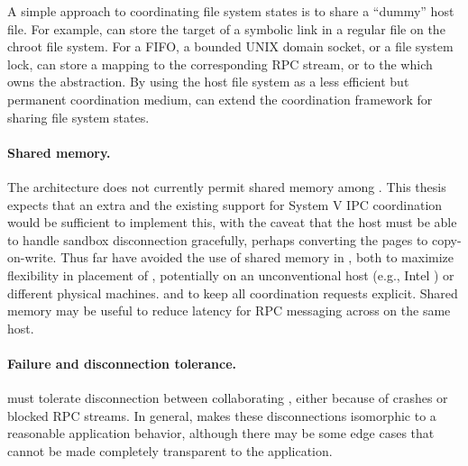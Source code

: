 
A simple approach to coordinating file system states is to share a ``dummy'' host file.
For example,  \thelibos{} can store the target of a symbolic link
in a regular file on the chroot file system.
For a FIFO, a bounded UNIX domain socket, or a file system lock,
\thelibos{} can store a mapping to the corresponding RPC stream, or to the \picoproc{} which owns the abstraction.
By using the host file system as a less efficient but permanent coordination medium,
\thelibos{} can extend the coordination framework for sharing file system states.



\paragraph{Shared memory.} The \graphene{} architecture 
does not currently permit shared memory among \picoprocs{}.
This thesis expects that an extra \hostapi{} and the existing support for System V IPC coordination would be sufficient to implement this,
with the caveat that the host must be able to handle sandbox disconnection gracefully, perhaps converting the pages to copy-on-write.
Thus far \graphene{} have avoided the use of shared memory in \thelibos{},
both to maximize flexibility in placement of \picoprocs{}, potentially on an unconventional host (e.g., Intel \sgx{}) or different physical machines.
and to keep all coordination requests explicit.
Shared memory may be useful to reduce latency for RPC messaging across \picoprocs{} on the same host.



 


\paragraph{Failure and disconnection tolerance.}  
\thelibos{} must tolerate disconnection between collaborating \picoprocs{},
either because of crashes or blocked RPC streams.  In general, \thelibos{} makes 
these disconnections isomorphic to a reasonable application behavior,
although there may be some edge cases that cannot be made completely transparent to the application.

